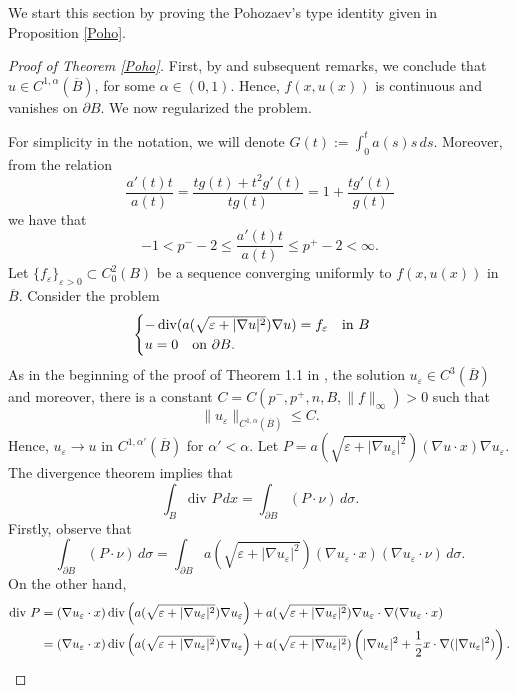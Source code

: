 \documentclass[leqno,twoside, 12pt]{amsart}
\theoremstyle{plain}
\numberwithin{equation}{section} \numberwithin{figure}{section}
\theoremstyle{definition}
\numberwithin{equation}{section}
\def\diver{\mathop{\text{\normalfont div}}}
\begin{document}
We start this section by proving the Pohozaev's type  identity given in Proposition \ref{Poho}.  
\begin{proof}[Proof of Theorem \ref{Poho}]
First, by \cite[Theorem 1.7]{L} and subsequent remarks, we conclude that $u\in C^{1, \alpha}(\overline{B})$, for some $\alpha\in (0, 1)$. Hence, $f(x, u(x))$ is continuous and vanishes on $\partial B$. We now regularized the problem.


For simplicity in the notation, we will denote $G(t):=\int_0^t a(s)s\,ds$.  Moreover, from the relation
$$
\dfrac{a'(t)t}{a(t)}= \dfrac{tg(t)+t^2g'(t)}{tg(t)}=1+\dfrac{tg'(t)}{g(t)}
$$
we have that
$$
-1<p^{-}-2\leq \dfrac{a'(t)t}{a(t)} \leq p^{+}-2<\infty.
$$
Let $\{f_\varepsilon\}_{\varepsilon>0} \subset C_0^{2}(B)$ be a sequence converging uniformly to $f(x, u(x))$ in $\overline{B}$. Consider the problem 
 \begin{equation}\label{auxiliary problem} 
\begin{cases}
-\diver(a(\sqrt{\varepsilon+|\nabla u|^2})\nabla u)= f_\varepsilon \quad \text{in }B\\
u=0 \quad \text{on }\partial B.
\end{cases}
\end{equation}As in the beginning of the proof of Theorem 1.1 in \cite{CM}, the solution $u_\varepsilon \in C^3(\overline{B})$ and moreover, there is a constant $C=C(p^{-}, p^{+}, n, B, \|f\|_{\infty})>0$ such that
$$\|u_\varepsilon\|_{C^{1, \alpha}(\overline{B})}\leq C.$$Hence, $u_\varepsilon \to u$ in $C^{1, \alpha'}(\overline{B})$ for $\alpha'<\alpha$. 
Let $P=a(\sqrt{\varepsilon+|\nabla u_\varepsilon|^2})(\nabla u\cdot x)\nabla u_\varepsilon$. The divergence theorem implies that
\begin{equation}\label{divergence theorem}
\int_B \text{div } P \,dx=\int_{\partial B} (P\cdot \nu)\,d\sigma.
\end{equation}Firstly, observe that
\begin{equation}\label{int2}
\int_{\partial B} (P\cdot \nu)\,d\sigma =\int_{\partial B}a(\sqrt{\varepsilon+|\nabla u_\varepsilon|^2})(\nabla u_{\varepsilon}\cdot x)(\nabla u_\varepsilon \cdot \nu)\,d\sigma.
\end{equation}On the other hand,
\begin{equation}
\begin{split}
\text{div } P&= (\nabla u_\varepsilon \cdot x)\diver\left( a(\sqrt{\varepsilon+|\nabla u_\varepsilon|^2})\nabla u_{\varepsilon}\right) + a(\sqrt{\varepsilon+|\nabla u_\varepsilon|^2})\nabla u_{\varepsilon} \cdot \nabla (\nabla u_\varepsilon \cdot x)\\& =(\nabla u_\varepsilon \cdot x)\diver\left( a(\sqrt{\varepsilon+|\nabla u_\varepsilon|^2})\nabla u_{\varepsilon}\right) + a(\sqrt{\varepsilon+|\nabla u_\varepsilon|^2})\left(|\nabla u_\varepsilon|^2+ \dfrac{1}{2}x\cdot \nabla(|\nabla u_\varepsilon|^2) \right).

\end{split}
\end{equation}
\end{proof}
\end{document}
